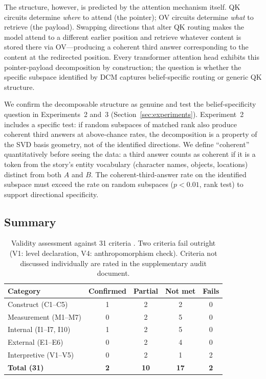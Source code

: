 \documentclass[11pt]{article}
\begin{document}
The structure, however, is predicted by the attention mechanism itself. QK circuits determine \emph{where} to attend (the pointer); OV circuits determine \emph{what} to retrieve (the payload). Swapping directions that alter QK routing makes the model attend to a different earlier position and retrieve whatever content is stored there via OV---producing a coherent third answer corresponding to the content at the redirected position. Every transformer attention head exhibits this pointer-payload decomposition by construction; the question is whether the specific subspace identified by DCM captures belief-specific routing or generic QK structure.

We confirm the decomposable structure as genuine and test the belief-specificity question in Experiments~2 and~3 (Section~\ref{sec:experiments}). Experiment~2 includes a specific test: if random subspaces of matched rank also produce coherent third answers at above-chance rates, the decomposition is a property of the SVD basis geometry, not of the identified directions. We define ``coherent'' quantitatively before seeing the data: a third answer counts as coherent if it is a token from the story's entity vocabulary (character names, objects, locations) distinct from both $A$ and $B$. The coherent-third-answer rate on the identified subspace must exceed the rate on random subspaces ($p < 0.01$, rank test) to support directional specificity.

\subsection{Summary}

\begin{table}[t]
\centering
\caption{Validity assessment against 31 criteria \citep{tower2026mechval}. Two criteria fail outright (V1: level declaration, V4: anthropomorphism check). Criteria not discussed individually are rated in the supplementary audit document.}
\label{tab:validity}
\begin{tabular}{lcccc}
\toprule
Category & Confirmed & Partial & Not met & Fails \\
\midrule
Construct (C1--C5) & 1 & 2 & 2 & 0 \\
Measurement (M1--M7) & 0 & 2 & 5 & 0 \\
Internal (I1--I7, I10) & 1 & 2 & 5 & 0 \\
External (E1--E6) & 0 & 2 & 4 & 0 \\
Interpretive (V1--V5) & 0 & 2 & 1 & 2 \\
\midrule
\textbf{Total (31)} & \textbf{2} & \textbf{10} & \textbf{17} & \textbf{2} \\
\bottomrule
\end{tabular}
\end{table}
\end{document}
